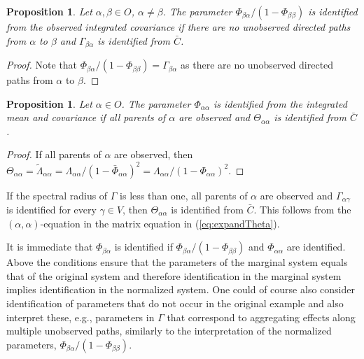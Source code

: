 \documentclass[accepted]{uai2021} %
\newtheorem{prop}[thm]{Proposition}
\begin{document}
\begin{prop}
	Let $\alpha,\beta \in O$, $\alpha\neq \beta$. The parameter 
	${\Phi}_{\beta\alpha}/(1-{\Phi}_{\beta\beta}) $ is 
	identified 
	from the observed integrated covariance if there 
	are no unobserved directed paths from 
	$\alpha$ to $\beta$ and $\Gamma_{\beta\alpha}$ is identified from 
	$\bar{C}$.
\end{prop}

\begin{proof}
	Note that ${\Phi}_{\beta\alpha}/(1-{\Phi}_{\beta\beta}) = 
	\Gamma_{\beta\alpha}$ as there 
	are no 
	unobserved directed paths from $\alpha$ to $\beta$.
\end{proof}

\begin{prop}
	Let $\alpha\in O$. The parameter $\Phi_{\alpha\alpha}$ is identified from 
	the 
	integrated mean and covariance if all 
	parents of $\alpha$ are observed and $\Theta_{\alpha\alpha}$ is identified 
	from 
	$\bar{C}$.
\end{prop}

\begin{proof}
	If all parents of $\alpha$ are observed, then $\Theta_{\alpha\alpha} = 
	\tilde{\Lambda}_{\alpha\alpha} = \Lambda_{\alpha\alpha}/(1 - 
	\bar{\Phi}_{\alpha\alpha})^2 = \Lambda_{\alpha\alpha}/(1 - 
	\Phi_{\alpha\alpha})^2$.
\end{proof}

If the spectral radius of $\Gamma$ is less than one, all parents of 
$\alpha$ are observed and $\Gamma_{\alpha\gamma}$ is 
identified for 
 every 
 $\gamma\in V$, then $\Theta_{\alpha\alpha}$ is identified from $\bar{C}$.
This follows from the $(\alpha,\alpha)$-equation in the matrix equation in 
(\ref{eq:expandTheta}).

It is immediate that $\Phi_{\beta\alpha}$ is identified if 
${\Phi}_{\beta\alpha}/(1-{\Phi}_{\beta\beta})$ and $\Phi_{\alpha\alpha}$ are 
identified. Above 
the 
conditions ensure that the parameters of the marginal system equals that of the 
original system and therefore identification in the marginal system implies 
identification in the normalized system. One could of course also consider 
identification of parameters that do not occur in the original example and also 
interpret these, e.g., parameters in $\Gamma$ that 
correspond to aggregating effects along multiple unobserved paths, similarly to 
the 
interpretation of the normalized parameters, 
${\Phi}_{\beta\alpha}/(1-{\Phi}_{\beta\beta})$.
\end{document}
